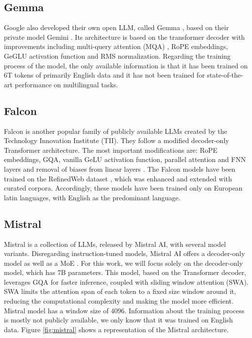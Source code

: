 \documentclass[11pt,english,listoffigures,listoftables]{tfgetsinf}
\begin{document}
\subsection{Gemma}

Google also developed their own open LLM, called Gemma \cite{team2024gemma}, based on their private model Gemini \cite{team2023gemini}. Its architecture is based on the transformer decoder with improvements including multi-query attention (MQA) \cite{shazeer2019mqa}, RoPE embeddings, GeGLU \cite{shazeer2020glu} activation function and RMS normalization. Regarding the training process of the model, the only available information is that it has been trained on 6T tokens of primarily English data and it has not been trained for state-of-the-art performance on multilingual tasks. 

\subsection{Falcon}

Falcon \cite{almazrouei2023falcon} is another popular family of publicly available LLMs created by the Technology Innovation Institute (TII). They follow a modified decoder-only Transformer architecture. The most important modifications are: RoPE embeddings, GQA, vanilla GeLU activation function, parallel attention and FNN layers \cite{gpt-j} and removal of biases from linear layers \cite{chowdhery2023palm}. The Falcon models have been trained on the RefinedWeb dataset \cite{penedo2023refinedweb}, which was enhanced and extended with curated corpora. Accordingly, these models have been trained only on European latin languages, with English as the predominant language.  

\subsection{Mistral}

Mistral is a collection of LLMs, released by Mistral AI, with several model variants. Disregarding instruction-tuned models, Mistral AI offers a decoder-only model \cite{jiang2023mistral} as well as a MoE \cite{jiang2024mixtral}. For this work, we will focus solely on the decoder-only model, which has 7B parameters. This model, based on the Transformer decoder, leverages GQA for faster inference, coupled with sliding window attention (SWA). SWA limits the attention span of each token to a fixed size window around it, reducing the computational complexity and making the model more efficient. Mistral model has a window size of 4096. Information about the training process is mostly not publicly available, we only know that it was trained on English data. Figure \ref{fig:mistral} shows a representation of the Mistral architecture.
\end{document}
